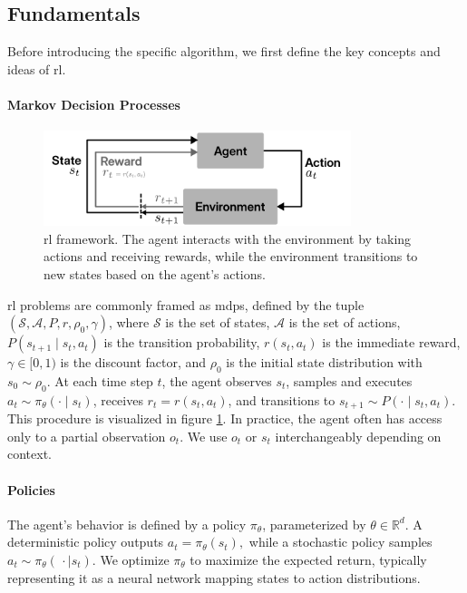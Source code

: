 \subsection{Fundamentals}
Before introducing the specific algorithm, we first define the key concepts and ideas of \gls{rl}.
\paragraph{Markov Decision Processes}

\begin{figure}
\centering
\includegraphics[width=0.8\textwidth]{images/figs/rl.pdf}
\caption[\gls{rl} framework]{\gls{rl} framework. The agent interacts with the environment by taking actions and receiving rewards, while the environment transitions to new states based on the agent's actions.}
\label{fig:rl_diagram}
\end{figure}

\gls{rl} problems are commonly framed as \gls{mdp}s, defined by the tuple \((\mathcal{S}, \mathcal{A}, P, r, \rho_0, \gamma)\), where \(\mathcal{S}\) is the set of states, \(\mathcal{A}\) is the set of actions, \(P(s_{t+1}\!\mid\!s_t,a_t)\) is the transition probability, \(r(s_t,a_t)\) is the immediate reward, \(\gamma \in [0,1)\) is the discount factor, and \(\rho_0\) is the initial state distribution with \(s_0 \sim \rho_0\). At each time step \(t\), the agent observes \(s_t\), samples and executes \(a_t \sim \pi_\theta(\cdot\mid s_t)\), receives \(r_t = r(s_t,a_t)\), and transitions to \(s_{t+1} \sim P(\cdot\mid s_t,a_t)\). This procedure is visualized in figure \ref{fig:rl_diagram}. In practice, the agent often has access only to a partial observation \(o_t\). We use \(o_t\) or \(s_t\) interchangeably depending on context.

\paragraph{Policies}
The agent's behavior is defined by a policy \(\pi_{\theta}\), parameterized by \(\theta \in \mathbb{R}^{d}\). A deterministic policy outputs
$ 
a_t = \pi_{\theta}(s_t),
$
while a stochastic policy samples
$
a_t \sim \pi_{\theta}(\,\cdot\mid s_t).
$
We optimize \(\pi_\theta\) to maximize the expected return, typically representing it as a neural network mapping states to action distributions.

